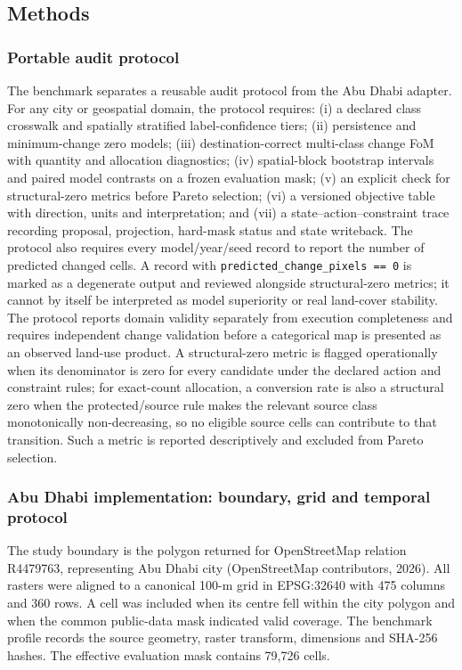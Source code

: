 \subsection{Methods}\label{methods}

\subsubsection{Portable audit protocol}\label{portable-audit-protocol}

The benchmark separates a reusable audit protocol from the Abu Dhabi
adapter. For any city or geospatial domain, the protocol requires: (i) a
declared class crosswalk and spatially stratified label-confidence
tiers; (ii) persistence and minimum-change zero models; (iii)
destination-correct multi-class change FoM with quantity and allocation
diagnostics; (iv) spatial-block bootstrap intervals and paired model
contrasts on a frozen evaluation mask; (v) an explicit check for
structural-zero metrics before Pareto selection; (vi) a versioned
objective table with direction, units and interpretation; and (vii) a
state--action--constraint trace recording proposal, projection,
hard-mask status and state writeback. The protocol also requires every
model/year/seed record to report the number of predicted changed cells.
A record with \texttt{predicted\_change\_pixels\ ==\ 0} is marked as a
degenerate output and reviewed alongside structural-zero metrics; it
cannot by itself be interpreted as model superiority or real land-cover
stability. The protocol reports domain validity separately from
execution completeness and requires independent change validation before
a categorical map is presented as an observed land-use product. A
structural-zero metric is flagged operationally when its denominator is
zero for every candidate under the declared action and constraint rules;
for exact-count allocation, a conversion rate is also a structural zero
when the protected/source rule makes the relevant source class
monotonically non-decreasing, so no eligible source cells can contribute
to that transition. Such a metric is reported descriptively and excluded
from Pareto selection.

\subsubsection{Abu Dhabi implementation: boundary, grid and temporal
protocol}\label{abu-dhabi-implementation-boundary-grid-and-temporal-protocol}

The study boundary is the polygon returned for OpenStreetMap relation
R4479763, representing Abu Dhabi city (OpenStreetMap contributors,
2026). All rasters were aligned to a canonical 100-m grid in EPSG:32640
with 475 columns and 360 rows. A cell was included when its centre fell
within the city polygon and when the common public-data mask indicated
valid coverage. The benchmark profile records the source geometry,
raster transform, dimensions and SHA-256 hashes. The effective
evaluation mask contains 79,726 cells.

